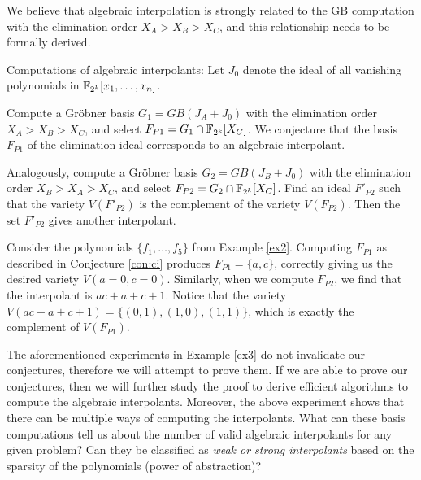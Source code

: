 We believe that algebraic interpolation is strongly related
to the GB computation with the elimination order $X_A>X_B>X_C$, and
this relationship needs to be formally derived. 

\begin{Conjecture} \label{con:ci}
Computations of algebraic interpolants: Let $J_0$ denote the ideal of
all vanishing polynomials in ${\mathbb{F}}_{2^k}[x_1,\dots,x_n]$.
\bi
\item  Compute a Gr\"obner basis $G_1 = GB(J_A + J_0)$ 
with the elimination order $X_A > X_B > X_C$, and select
$F_{P1}=G_1\cap{\mathbb{F}}_{2^k}[X_C]$. We conjecture that the \Grobner
basis $F_{P1}$ of the elimination ideal corresponds to an algebraic
interpolant. 

\item Analogously, compute a Gr\"obner basis $G_2 = GB(J_B + J_0)$ 
with the elimination order $X_B > X_A > X_C$, and select
$F_{P2}=G_2\cap{\mathbb{F}}_{2^k}[X_C]$. Find an ideal $F'_{P2}$ such that
the variety $V(F'_{P2})$ is the complement of the variety
$V(F_{P2})$. Then the set $F'_{P2}$ gives another interpolant.
\ei
\end{Conjecture}


\begin{Example}\label{ex3}
Consider the polynomials $\{f_1, \dots,f_5\}$ from Example
\ref{ex2}. Computing $F_{P1}$ as described in Conjecture \ref{con:ci} 
produces $F_{P1} = \{a, c\}$, correctly giving us the desired variety
$V(a = 0, c = 0)$. Similarly, when we compute $F_{P2}$, we find that
the interpolant is $ac + a + c + 1$. Notice that the variety 
$V(ac+a+c+1)=\{(0,1), (1,0), (1,1)\}$, which is exactly the complement
of $V(F_{P1})$.  
\end{Example}

The aforementioned experiments in Example \ref{ex3} do not invalidate
our conjectures, therefore we will attempt to prove them. If we are
able to prove our conjectures, then we will further study the proof to
derive efficient algorithms to compute the algebraic
interpolants. Moreover, the above experiment shows that there can be
multiple ways of computing the interpolants. What can these \Grobner
basis computations tell us about the number of valid algebraic
interpolants for any given problem? Can they be classified as {\it weak
  or strong interpolants} based on the sparsity of the polynomials
(power of abstraction)? 

